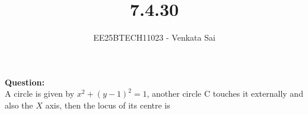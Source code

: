 \documentclass[journal]{IEEEtran}
\begin{document}


\title{7.4.30}
\author{EE25BTECH11023 - Venkata Sai}
\maketitle \vspace{-1.5cm}
\renewcommand{\thefigure}{\theenumi}
\renewcommand{\thetable}{\theenumi}
\setlength{\intextsep}{10pt} %

\renewcommand{\thetable}{\theenumi}

\textbf{Question:}  \\
A circle is given by $x^2+(y - 1)^2=1$, another circle C touches it externally and also the $X$ axis, then the locus of its centre is
\end{document}
